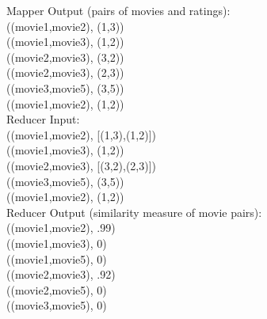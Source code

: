 \documentclass{article}
\begin{document}
\begin{itemize}
\begin{itemize}
			Mapper Output (pairs of movies and ratings):\\
			((movie1,movie2), (1,3))\\
			((movie1,movie3), (1,2))\\
			((movie2,movie3), (3,2))\\
			((movie2,movie3), (2,3))\\
			((movie3,movie5), (3,5))\\
			((movie1,movie2), (1,2))\\
			
			Reducer Input:\\
			((movie1,movie2), [(1,3),(1,2)])\\ 
			((movie1,movie3), (1,2))\\
			((movie2,movie3), [(3,2),(2,3)])\\
			((movie3,movie5), (3,5))\\
			((movie1,movie2), (1,2))\\
			
			Reducer Output (similarity measure of movie pairs):\\
			((movie1,movie2), .99)\\
			((movie1,movie3), 0)\\
			((movie1,movie5), 0)\\
			((movie2,movie3), .92)\\
			((movie2,movie5), 0)\\
			((movie3,movie5), 0)\\
			
	\end{itemize}
	
\end{itemize}
\end{document}
